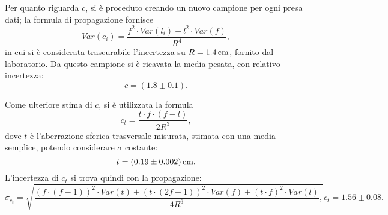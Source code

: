 Per quanto riguarda $c$, si \`e proceduto creando un nuovo campione per ogni presa dati; la formula di propagazione fornisce %
\[ Var(c_i) =\frac{f^2 \cdot Var(l_i) + l^2 \cdot Var(f)}{R^4}, \]
in cui si \`e considerata trascurabile l'incertezza su $R=1.4\,\mathrm{cm}$, fornito dal laboratorio.
Da questo campione si \`e ricavata la media pesata, con relativo incertezza:
\[ c = (1.8 \pm 0.1). \]

Come ulteriore stima di $c$, si \`e utilizzata la formula
\[ c_t = \frac{t \cdot f \cdot (f-l)}{2R^3}, \]
dove $t$ \`e l'aberrazione sferica trasversale misurata, stimata con una media semplice, potendo considerare $\sigma$ costante:
\[ t = (0.19 \pm 0.002) \,\mathrm{cm}.\]
L'incertezza di $c_t$ si trova quindi con la propagazione: 
\[ \sigma_{c_t} = \sqrt{ \frac
{ (f \cdot (f-1))^2 \cdot Var(t)  +  (t \cdot (2f-1))^2 \cdot Var(f)  +  (t \cdot f)^2 \cdot Var(l)}
{4R^6},
}
c_t = 1.56 \pm 0.08. \]




